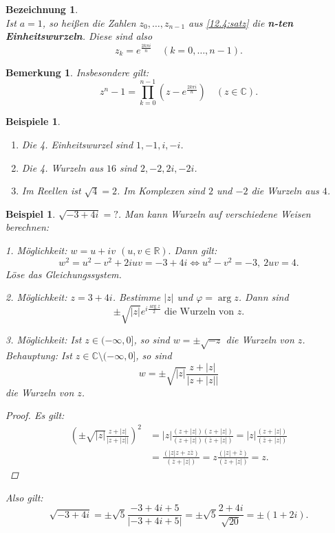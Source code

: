 \documentclass[12pt]{extreport} %
\newcommand{\C}{\mathbb{C}}
\newcommand{\R}{\mathbb{R}}
\theoremstyle{named}
\theoremstyle{itshape}
\theoremstyle{normal}
\newtheorem*{beispiel*}{Beispiel}
\newtheorem*{beispiele}{Beispiele}
\newtheorem*{bemerkung}{Bemerkung}
\newtheorem*{bezeichnung}{Bezeichnung}
\begin{document}
{
\begin{bezeichnung} ~\\
	Ist $a = 1$, so hei{\ss}en die Zahlen $z_{0}, \dotsc, z_{n-1}$ aus \ref{12.4:satz} die \textbf{n-ten Einheitswurzeln}.	Diese sind also 
	$$z_{k} = e^{\frac{2 k \pi i}{n}} \quad (k = 0, \dotsc, n-1).$$
\end{bezeichnung}


\begin{bemerkung}
	Insbesondere gilt:
	$$
	z^{n} - 1 = \prod_{k=0}^{n-1} (z -e^{\frac{2 k \pi i}{n}}) \quad (z \in \C).
	$$	
\end{bemerkung}


\begin{beispiele} ~\
	\begin{enumerate}
	        \item Die 4. Einheitswurzel sind $1, -1, i, -i$.
	        \item Die 4. Wurzeln aus $16$ sind $2, -2, 2i, -2i$.
		\item Im Reellen ist $\sqrt{4} = 2$. Im Komplexen sind $2$ und $-2$ die Wurzeln aus $4$.
	\end{enumerate}	
\end{beispiele}


\begin{beispiel*}
        $\sqrt{-3 + 4i}=?$. Man kann Wurzeln auf verschiedene Weisen berechnen:
	\begin{description}
		\item 1. Möglichkeit: $w = u + iv$ $(u,v \in \R).$ Dann gilt: 
			$$w^{2} = u^{2} - v^{2} + 2iuv = -3 + 4i \iff u^{2} - v^{2} = -3, ~ 2uv = 4. $$
			Löse das Gleichungssystem.
		\item 2. Möglichkeit: $z = 3 + 4i$. Bestimme $|z|$ und $\varphi = \arg z$. Dann sind
			$$ \pm \sqrt{|z|} e^{i \frac{\arg z}{2}} \text{ die Wurzeln von } z. $$
		\item 3. Möglichkeit: Ist $z \in (-\infty, 0]$, so sind $w = \pm \sqrt{-z}$ die Wurzeln von $z$. \\
		        Behauptung: Ist $z \in \C \setminus (-\infty, 0]$, so sind
			$$ w = \pm \sqrt{|z|} \frac{z + |z|}{\left| z + |z| \right|} $$
			die Wurzeln von $z$.
			\begin{proof}
				Es gilt:
				\begin{align*}
					 \left( \pm \sqrt{|z|} \frac{z + |z|}{\left| z + |z| \right|} \right)^{2} & = |z| \frac{(z + |z|) (z + |z|)}{(z + |z|) (\overline{z} + |z|)} 
					 =  |z| \frac{(z + |z|)}{(\overline{z} + |z|)} \\
					 & = \frac{(|z|z + z \overline{z})}{(\overline{z} + |z|)} = z \frac{(|z| + \overline{z})}{(\overline{z} + |z|)} = z. 
				\end{align*}
			\end{proof}
			Also gilt: 
			$$\sqrt{-3 + 4i} = \pm \sqrt{5} \frac{-3 + 4i + 5}{|-3 + 4i + 5|} = \pm \sqrt{5} \frac{2 + 4i}{\sqrt{20}} = \pm (1 + 2i).$$
	\end{description}
\end{beispiel*}


}
\end{document}
